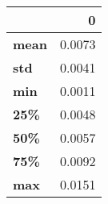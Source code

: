 \begin{tabular}{lr}
\toprule
{} &       0 \\
\midrule
\textbf{mean} &  0.0073 \\
\textbf{std } &  0.0041 \\
\textbf{min } &  0.0011 \\
\textbf{25\% } &  0.0048 \\
\textbf{50\% } &  0.0057 \\
\textbf{75\% } &  0.0092 \\
\textbf{max } &  0.0151 \\
\bottomrule
\end{tabular}
